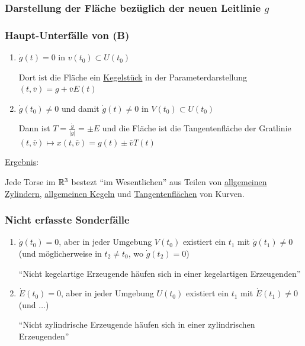 \subsubsection{Darstellung der Fläche bezüglich der neuen Leitlinie \(g\)}

\subsubsection{Haupt-Unterfälle von (B)}
\begin{enumerate}
 \item[{\color{green}(Ba)}] \(\dot g(t) = 0\) in \(v(t_0) \subset U(t_0)\) \par
 Dort ist die Fläche ein \uline{Kegelstück} in der Parameterdarstellung \((t, \overline v) = g + \overline v E(t)\)
 \item[{\color{green}(Bb)}] \(\dot g(t_0) \ne 0\) und damit \(\dot g(t) \ne 0\) in \(V(t_0) \subset U(t_0)\) \par
 Dann ist \(T= \frac{\dot g}{|g|} = \pm E\) und die Fläche ist die Tangentenfläche der Gratlinie \((t, \overline v) \mapsto x(t, \overline v) = g(t) \pm \overline v T(t)\)
\end{enumerate}

\uline{Ergebnis}:

\begin{satz}\label{satz264}
 Jede Torse im \(\mathbb{R}^3\) bestezt ``im Wesentlichen'' aus Teilen von \uline{allgemeinen Zylindern}, \uline{allgemeinen Kegeln} und \uline{Tangentenflächen} von Kurven.
\end{satz}

\subsubsection{Nicht erfasste Sonderfälle}
\begin{enumerate}
 \item[{\color{magenta}(Bc)}] \(\dot g(t_0) = 0\), aber in jeder Umgebung \(V(t_0)\) existiert ein \(t_1\) mit \(\dot g(t_1) \ne 0\) (und möglicherweise in \(t_2 \ne t_0\), wo \(\dot g(t_2) = 0\)) \par
 ``Nicht kegelartige Erzeugende häufen sich in einer kegelartigen Erzeugenden''
 \item[{\color{magenta}(Bd)}] \(\dot E(t_0) = 0\), aber in jeder Umgebung \(U(t_0)\) existiert ein \(t_1\) mit \(\dot E(t_1) \ne 0\) (und \(\dots\)) \par
 ``Nicht zylindrische Erzeugende häufen sich in einer zylindrischen Erzeugenden''
\end{enumerate}

